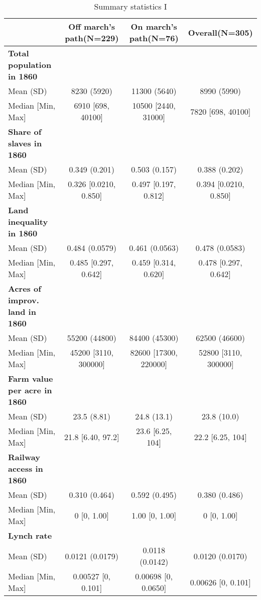 \begin{table}[h]

\caption{\label{tab:desc_stat}Summary statistics I}
\centering
\fontsize{8}{10}\selectfont
\begin{tabular}[t]{>{}lccc}
\toprule
 & Off march's path(N=229) & On march's path(N=76) & Overall(N=305)\\
\midrule
\textbf{Total population in 1860} &  &  & \\
Mean (SD) & 8230 (5920) & 11300 (5640) & 8990 (5990)\\
Median [Min, Max] & 6910 [698, 40100] & 10500 [2440, 31000] & 7820 [698, 40100]\\
\addlinespace
\textbf{Share of slaves in 1860} &  &  & \\
Mean (SD) & 0.349 (0.201) & 0.503 (0.157) & 0.388 (0.202)\\
Median [Min, Max] & 0.326 [0.0210, 0.850] & 0.497 [0.197, 0.812] & 0.394 [0.0210, 0.850]\\
\addlinespace
\textbf{Land inequality in 1860} &  &  & \\
Mean (SD) & 0.484 (0.0579) & 0.461 (0.0563) & 0.478 (0.0583)\\
Median [Min, Max] & 0.485 [0.297, 0.642] & 0.459 [0.314, 0.620] & 0.478 [0.297, 0.642]\\
\addlinespace
\textbf{Acres of improv. land in 1860} &  &  & \\
Mean (SD) & 55200 (44800) & 84400 (45300) & 62500 (46600)\\
Median [Min, Max] & 45200 [3110, 300000] & 82600 [17300, 220000] & 52800 [3110, 300000]\\
\addlinespace
\textbf{Farm value per acre in 1860} &  &  & \\
Mean (SD) & 23.5 (8.81) & 24.8 (13.1) & 23.8 (10.0)\\
Median [Min, Max] & 21.8 [6.40, 97.2] & 23.6 [6.25, 104] & 22.2 [6.25, 104]\\
\addlinespace
\textbf{Railway access in 1860} &  &  & \\
Mean (SD) & 0.310 (0.464) & 0.592 (0.495) & 0.380 (0.486)\\
Median [Min, Max] & 0 [0, 1.00] & 1.00 [0, 1.00] & 0 [0, 1.00]\\
\addlinespace
\textbf{Lynch rate} &  &  & \\
Mean (SD) & 0.0121 (0.0179) & 0.0118 (0.0142) & 0.0120 (0.0170)\\
Median [Min, Max] & 0.00527 [0, 0.101] & 0.00698 [0, 0.0650] & 0.00626 [0, 0.101]\\

\end{tabular}
\end{table}
